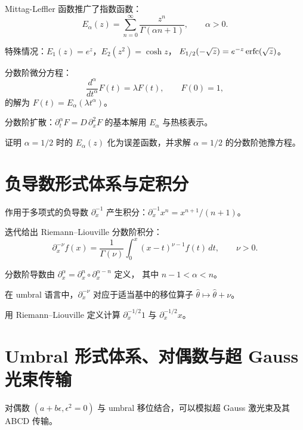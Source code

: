 Mittag-Leffler 函数推广了指数函数：
\begin{equation}
E_\alpha(z) = \sum_{n=0}^{\infty}\frac{z^n}{\Gamma(\alpha n+1)},
\qquad \alpha>0.
\label{eq:9.7.1}
\end{equation}

特殊情况：$E_1(z)=e^z$，$E_2(z^2)=\cosh z$，
$E_{1/2}(-\sqrt{z})=e^{-z}\operatorname{erfc}(\sqrt{z})$。

分数阶微分方程：
\begin{equation}
\frac{d^\alpha}{dt^\alpha}F(t) = \lambda F(t), \qquad F(0)=1,
\label{eq:9.7.2}
\end{equation}
的解为 $F(t)=E_\alpha(\lambda t^\alpha)$。

分数阶扩散：$\partial_t^\alpha F = D\,\partial_x^2 F$ 的基本解用 $E_\alpha$ 与热核表示。

\begin{exercise}
证明 $\alpha=1/2$ 时的 $E_\alpha(z)$ 化为误差函数，并求解 $\alpha=1/2$ 的分数阶弛豫方程。
\end{exercise}

\section{负导数形式体系与定积分}

作用于多项式的负导数 $\partial_x^{-1}$ 产生积分：$\partial_x^{-1}x^n = x^{n+1}/(n+1)$。

迭代给出 Riemann--Liouville 分数阶积分：
\begin{equation}
\partial_x^{-\nu}f(x) = \frac{1}{\Gamma(\nu)}\int_0^x (x-t)^{\nu-1}f(t)\,dt,
\qquad \nu>0.
\label{eq:9.8.1}
\end{equation}

分数阶导数由 $\partial_x^\alpha = \partial_x^n\circ\partial_x^{\alpha-n}$ 定义，
其中 $n-1<\alpha<n$。

在 umbral 语言中，$\partial_x^{-\nu}$ 对应于适当基中的移位算子
$\hat\theta\mapsto\hat\theta+\nu$。

\begin{exercise}
用 Riemann--Liouville 定义计算 $\partial_x^{-1/2}1$ 与 $\partial_x^{-1/2}x$。
\end{exercise}

\section{Umbral 形式体系、对偶数与超 Gauss 光束传输}

对偶数 $(a+b\epsilon,\epsilon^2=0)$ 与 umbral 移位结合，可以模拟超 Gauss 激光束及其 ABCD 传输。

